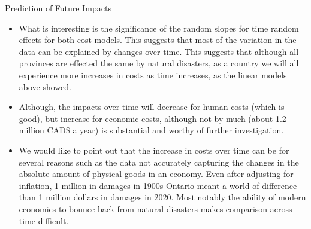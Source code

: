 \begin{frame}{Prediction of Future Impacts}
\begin{itemize}

	\item What is interesting is the significance of the random slopes for time random effects for both cost models. This suggests that most of the variation in the data can be explained by changes over time. This suggests that although all provinces are effected the same by natural disasters, as a country we will all experience more increases in costs as time increases, as the linear models above showed.
	\item Although, the impacts over time will decrease for human costs (which is good), but increase for economic costs, although not by much (about 1.2 million CAD\$ a year) is substantial and worthy of further investigation.
	\item We would like to point out that the increase in costs over time can be for several reasons such as the data not accurately capturing the changes in the absolute amount of physical goods in an economy. Even after adjusting for inflation, 1 million in damages in 1900s Ontario meant a world of difference than 1 million dollars in damages in 2020. Most notably the ability of modern economies to bounce back from natural disasters makes comparison across time difficult. 
\end{itemize}
\end{frame}